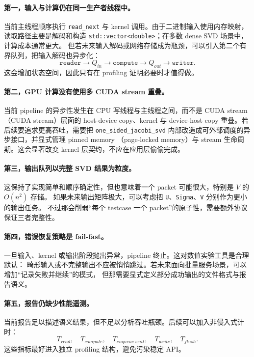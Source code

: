\paragraph{第一，输入与计算仍在同一生产者线程中。}
当前主线程顺序执行 \texttt{read\_next} 与 kernel 调用。由于二进制输入使用内存映射，
读取路径主要是解码和构造 \texttt{std::vector<double>}；在多数 dense SVD 场景中，计算成本通常更大。
但若未来输入解码或网络存储成为瓶颈，可以引入第二个有界队列，把输入解码也异步化：
\[
    \texttt{reader}
    \rightarrow
    Q_{in}
    \rightarrow
    \texttt{compute}
    \rightarrow
    Q_{out}
    \rightarrow
    \texttt{writer}.
\]
这会增加状态空间，因此只有在 profiling 证明必要时才值得做。

\paragraph{第二，GPU 计算没有使用多 CUDA stream 重叠。}
当前 pipeline 的异步性发生在 CPU 写线程与主线程之间，而不是 CUDA stream（CUDA stream）层面的
host-device copy、kernel 与 device-host copy 重叠。若后续要追求更高吞吐，需要把
\texttt{one\_sided\_jacobi\_svd} 内部改造成可外部调度的异步接口，并显式管理 pinned memory
（page-locked memory）与 stream 生命周期。这会显著改变 kernel 层契约，不应在应用层偷偷完成。

\paragraph{第三，输出队列以完整 SVD 结果为粒度。}
这保持了实现简单和顺序确定性，但也意味着一个 packet 可能很大，特别是 $V$ 的 $O(n^2)$ 存储。
如果未来输出矩阵极大，可以考虑把 \texttt{U}、\texttt{Sigma}、\texttt{V} 分别作为更小的输出任务。
不过那会削弱“每个 testcase 一个 packet”的原子性，需要额外协议保证三者完整性。

\paragraph{第四，错误恢复策略是 fail-fast。}
一旦输入、kernel 或输出阶段抛出异常，pipeline 终止。这对数值实验工具是合理默认：
畸形输入或不完整输出不应被悄悄跳过。若未来面向批量服务场景，可以增加“记录失败并继续”的模式，
但那需要显式定义部分成功输出的文件格式与报告语义。

\paragraph{第五，报告仍缺少性能遥测。}
当前报告足以描述语义结果，但不足以分析吞吐瓶颈。后续可以加入非侵入式计时：
\[
    T_{read},\quad T_{compute},\quad T_{enqueue\ wait},\quad T_{write},\quad T_{flush}.
\]
这些指标最好进入独立 profiling 结构，避免污染稳定 API。

